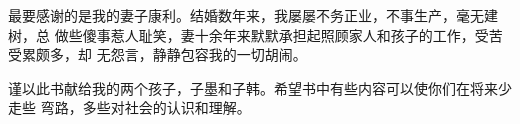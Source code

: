 最要感谢的是我的妻子康利。结婚数年来，我屡屡不务正业，不事生产，毫无建树，总
做些傻事惹人耻笑，妻十余年来默默承担起照顾家人和孩子的工作，受苦受累颇多，却
无怨言，静静包容我的一切胡闹。

谨以此书献给我的两个孩子，子墨和子韩。希望书中有些内容可以使你们在将来少走些
弯路，多些对社会的认识和理解。








